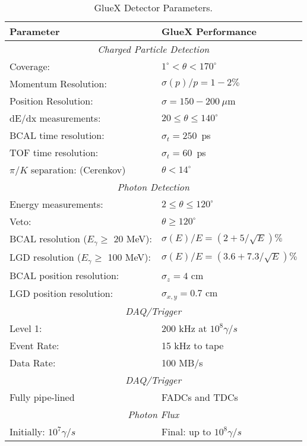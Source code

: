 \documentclass[11pt]{article}
\begin{document}
\begin{table}
\caption[GlueX Detector Performance]
{\label{gluex_det}
GlueX Detector Parameters.}
\begin{center}
{\small 
\begin{tabular}{ll}
\hline
\hline
{\centering \textbf{\textbf{Parameter}}} & 
{\centering \textbf{\textbf{GlueX Performance}}} \\
\hline
\multicolumn{2}{c}{\emph{Charged Particle Detection}} \\
Coverage:             & $1^{\circ} < \theta < 170^{\circ}$\\
Momentum Resolution:  & $\sigma(p)/p=1-2\%$ \\
Position Resolution:  & $\sigma=150-200\ \mu$m \\
dE/dx measurements:   & $20\le \theta \le 140^{\circ}$ \\
BCAL time resolution: & $\sigma_t=250$~ps \\
TOF time resolution:  & $\sigma_t=60$~ps \\
$\pi/K$ separation: (Cerenkov) & $\theta < 14^{\circ}$ \\
\multicolumn{2}{c}{\emph{Photon Detection}} \\
Energy measurements:   & $2\le \theta \le 120^{\circ}$ \\
Veto:                 & $\theta \geq 120^{\circ}$ \\
BCAL resolution ($E_{\gamma}\geq$ 20 MeV):  & $\sigma(E)/E=(2+5/\sqrt{E})\%$ \\
LGD resolution ($E_{\gamma}\geq$ 100 MeV): & $\sigma(E)/E=(3.6+7.3/\sqrt{E})\%$ \\
BCAL  position resolution: & $\sigma_z=4$ cm \\
LGD  position resolution: & $\sigma_{x,y}=0.7$ cm  \\
\multicolumn{2}{c}{\emph{DAQ/Trigger}} \\
Level 1:     & 200 kHz at $10^{8}\gamma/s$\\
Event Rate: & 15 kHz to tape \\
Data Rate:   & 100 MB/s \\
\multicolumn{2}{c}{\emph{DAQ/Trigger}} \\
Fully pipe-lined &  FADCs and TDCs \\
\multicolumn{2}{c}{\emph{Photon Flux}} \\
Initially: $10^{7} \gamma/s$ & Final: up to $10^{8}\gamma/s$\\
\hline
\end{tabular}
}
\end{center}
\end{table}
\end{document}
